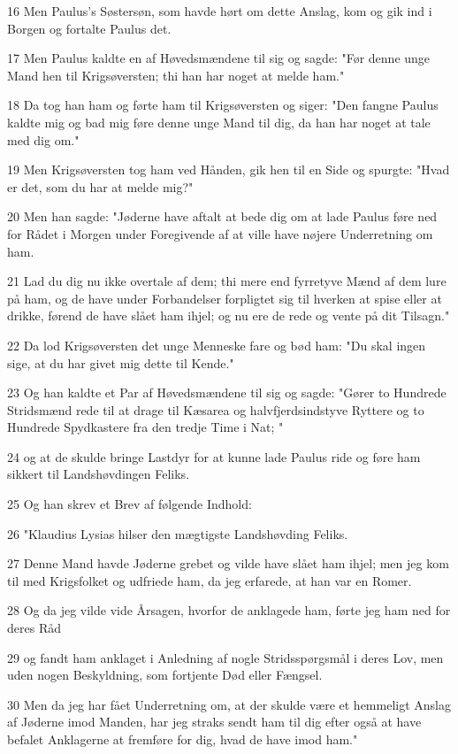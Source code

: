 \par 16 Men Paulus's Søstersøn, som havde hørt om dette Anslag, kom og gik ind i Borgen og fortalte Paulus det.
\par 17 Men Paulus kaldte en af Høvedsmændene til sig og sagde: "Før denne unge Mand hen til Krigsøversten; thi han har noget at melde ham."
\par 18 Da tog han ham og førte ham til Krigsøversten og siger: "Den fangne Paulus kaldte mig og bad mig føre denne unge Mand til dig, da han har noget at tale med dig om."
\par 19 Men Krigsøversten tog ham ved Hånden, gik hen til en Side og spurgte: "Hvad er det, som du har at melde mig?"
\par 20 Men han sagde: "Jøderne have aftalt at bede dig om at lade Paulus føre ned for Rådet i Morgen under Foregivende af at ville have nøjere Underretning om ham.
\par 21 Lad du dig nu ikke overtale af dem; thi mere end fyrretyve Mænd af dem lure på ham, og de have under Forbandelser forpligtet sig til hverken at spise eller at drikke, førend de have slået ham ihjel; og nu ere de rede og vente på dit Tilsagn."
\par 22 Da lod Krigsøversten det unge Menneske fare og bød ham: "Du skal ingen sige, at du har givet mig dette til Kende."
\par 23 Og han kaldte et Par af Høvedsmændene til sig og sagde: "Gører to Hundrede Stridsmænd rede til at drage til Kæsarea og halvfjerdsindstyve Ryttere og to Hundrede Spydkastere fra den tredje Time i Nat; "
\par 24 og at de skulde bringe Lastdyr for at kunne lade Paulus ride og føre ham sikkert til Landshøvdingen Feliks.
\par 25 Og han skrev et Brev af følgende Indhold:
\par 26 "Klaudius Lysias hilser den mægtigste Landshøvding Feliks.
\par 27 Denne Mand havde Jøderne grebet og vilde have slået ham ihjel; men jeg kom til med Krigsfolket og udfriede ham, da jeg erfarede, at han var en Romer.
\par 28 Og da jeg vilde vide Årsagen, hvorfor de anklagede ham, førte jeg ham ned for deres Råd
\par 29 og fandt ham anklaget i Anledning af nogle Stridsspørgsmål i deres Lov, men uden nogen Beskyldning, som fortjente Død eller Fængsel.
\par 30 Men da jeg har fået Underretning om, at der skulde være et hemmeligt Anslag af Jøderne imod Manden, har jeg straks sendt ham til dig efter også at have befalet Anklagerne at fremføre for dig, hvad de have imod ham."
